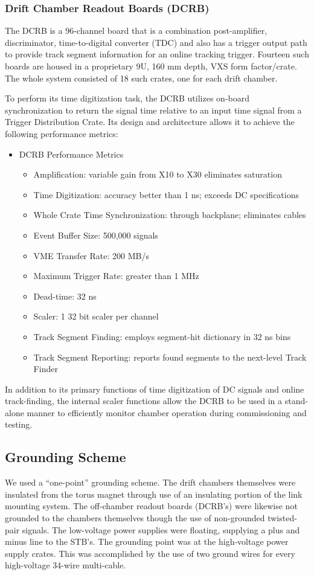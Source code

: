 \subsubsection{Drift Chamber Readout Boards (DCRB)}

The DCRB is a 96-channel board that is a combination post-amplifier,
discriminator, time-to-digital converter (TDC) and also has a trigger
output path to provide track segment information for an online tracking trigger.
Fourteen such boards are housed in
a proprietary 9U, 160 mm depth, VXS form factor/crate.
The whole system consisted of 18 such crates, one for each drift chamber.

To perform its time digitization task, the DCRB utilizes on-board synchronization to
return the signal time relative to an input time signal from  a Trigger Distribution
Crate.
Its design and architecture
allows it to achieve the following performance metrics:
\begin{itemize}
\item DCRB Performance Metrics
\begin{itemize}
\item Amplification: variable gain from X10 to X30 eliminates saturation
\item Time Digitization: accuracy better than 1 ns; exceeds DC specifications
\item Whole Crate Time Synchronization: through backplane; eliminates cables
\item Event Buffer Size: 500,000 signals
\item VME Transfer Rate: 200 MB/s
\item Maximum Trigger Rate: greater than 1 MHz
\item Dead-time: 32 ns
\item Scaler: 1 32 bit scaler per channel
\item Track Segment Finding: employs segment-hit dictionary in 32 ns bins
\item Track Segment Reporting: reports found segments to the next-level Track Finder
\end{itemize}
\end{itemize}

In addition to its primary functions of time digitization of DC signals and online
track-finding, the internal scaler functions allow the DCRB to be used in 
a stand-alone manner to efficiently monitor chamber operation during commissioning
and testing.

\subsection{Grounding Scheme}
We used a ``one-point'' grounding scheme.  The drift chambers themselves were insulated
from the torus magnet through use of an insulating portion of the link
mounting system.  The off-chamber readout boards (DCRB's) were likewise not grounded
to the chambers themselves though the use of non-grounded twisted-pair signals.
The low-voltage power supplies were floating, supplying a plus and minus line 
to the STB's.
The grounding point was at the high-voltage power supply crates.  This was accomplished
by the use of two ground wires for every high-voltage 34-wire multi-cable.
